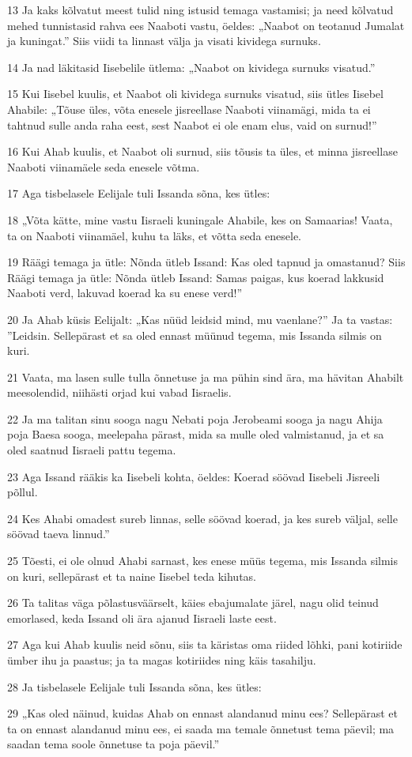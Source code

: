 \par 13 Ja kaks kõlvatut meest tulid ning istusid temaga vastamisi; ja need kõlvatud mehed tunnistasid rahva ees Naaboti vastu, öeldes: „Naabot on teotanud Jumalat ja kuningat.” Siis viidi ta linnast välja ja visati kividega surnuks.
\par 14 Ja nad läkitasid Iisebelile ütlema: „Naabot on kividega surnuks visatud.”
\par 15 Kui Iisebel kuulis, et Naabot oli kividega surnuks visatud, siis ütles Iisebel Ahabile: „Tõuse üles, võta enesele jisreellase Naaboti viinamägi, mida ta ei tahtnud sulle anda raha eest, sest Naabot ei ole enam elus, vaid on surnud!”
\par 16 Kui Ahab kuulis, et Naabot oli surnud, siis tõusis ta üles, et minna jisreellase Naaboti viinamäele seda enesele võtma.
\par 17 Aga tisbelasele Eelijale tuli Issanda sõna, kes ütles:
\par 18 „Võta kätte, mine vastu Iisraeli kuningale Ahabile, kes on Samaarias! Vaata, ta on Naaboti viinamäel, kuhu ta läks, et võtta seda enesele.
\par 19 Räägi temaga ja ütle: Nõnda ütleb Issand: Kas oled tapnud ja omastanud? Siis Räägi temaga ja ütle: Nõnda ütleb Issand: Samas paigas, kus koerad lakkusid Naaboti verd, lakuvad koerad ka su enese verd!”
\par 20 Ja Ahab küsis Eelijalt: „Kas nüüd leidsid mind, mu vaenlane?” Ja ta vastas: ”Leidsin. Sellepärast et sa oled ennast müünud tegema, mis Issanda silmis on kuri.
\par 21 Vaata, ma lasen sulle tulla õnnetuse ja ma pühin sind ära, ma hävitan Ahabilt meesolendid, niihästi orjad kui vabad Iisraelis.
\par 22 Ja ma talitan sinu sooga nagu Nebati poja Jerobeami sooga ja nagu Ahija poja Baesa sooga, meelepaha pärast, mida sa mulle oled valmistanud, ja et sa oled saatnud Iisraeli pattu tegema.
\par 23 Aga Issand rääkis ka Iisebeli kohta, öeldes: Koerad söövad Iisebeli Jisreeli põllul.
\par 24 Kes Ahabi omadest sureb linnas, selle söövad koerad, ja kes sureb väljal, selle söövad taeva linnud.”
\par 25 Tõesti, ei ole olnud Ahabi sarnast, kes enese müüs tegema, mis Issanda silmis on kuri, sellepärast et ta naine Iisebel teda kihutas.
\par 26 Ta talitas väga põlastusväärselt, käies ebajumalate järel, nagu olid teinud emorlased, keda Issand oli ära ajanud Iisraeli laste eest.
\par 27 Aga kui Ahab kuulis neid sõnu, siis ta käristas oma riided lõhki, pani kotiriide ümber ihu ja paastus; ja ta magas kotiriides ning käis tasahilju.
\par 28 Ja tisbelasele Eelijale tuli Issanda sõna, kes ütles:
\par 29 „Kas oled näinud, kuidas Ahab on ennast alandanud minu ees? Sellepärast et ta on ennast alandanud minu ees, ei saada ma temale õnnetust tema päevil; ma saadan tema soole õnnetuse ta poja päevil.”

